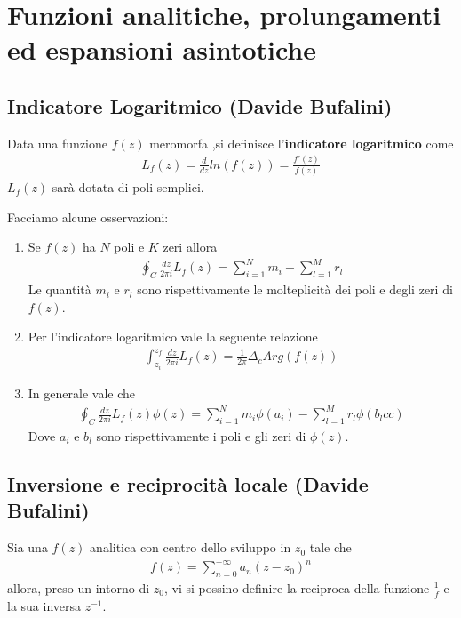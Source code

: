 \chapter{Funzioni analitiche, prolungamenti ed espansioni asintotiche}

\section{Indicatore Logaritmico (Davide Bufalini)}
Data una funzione $f(z)$ meromorfa ,si definisce l'\textbf{indicatore logaritmico} come
\begin{align}
	L_f(z) = \frac{d}{dz}ln(f(z)) = \frac{f'(z)}{f(z)}
\end{align}
$L_f(z)$ sarà dotata di poli semplici.


Facciamo alcune osservazioni:
\begin{enumerate}
	\item Se $f(z)$ ha $N$ poli e $K$ zeri allora
	\begin{align}
		\oint_C \frac{dz}{2\pi i} L_f(z) = \sum_{i=1}^{N} m_i - \sum_{l=1}^{M}r_l
	\end{align}
	Le quantità $m_i$ e $r_l$ sono rispettivamente le molteplicità dei poli e degli zeri di $f(z)$.
	\item Per l'indicatore logaritmico vale la seguente relazione
	\begin{align}
		\int_{z_i}^{z_f}\frac{dz}{2\pi i} L_f(z) = \frac{1}{2\pi} \Delta_c Arg(f(z))
	\end{align}
	\item In generale vale che
	\begin{align}
		\oint_C \frac{dz}{2\pi i} L_f(z) \phi(z) = \sum_{i=1}^{N} m_i\phi(a_i) - \sum_{l=1}^{M}r_l\phi(b_lcc)
	\end{align}
	Dove $a_i$ e $b_l$ sono rispettivamente i poli e gli zeri di $\phi(z)$. 
\end{enumerate}

\newpage

\section{Inversione e reciprocità locale (Davide Bufalini)}

Sia una $f(z)$ analitica con centro dello sviluppo in $z_0$ tale che
\begin{align}
	f(z) = \sum_{n=0}^{+\infty} a_n (z-z_0)^n	\label{eq1}
\end{align}
allora, preso un intorno di $z_0$, vi si possino definire la reciproca della funzione $\frac{1}{f}$ e la sua inversa $z^{-1}$.

